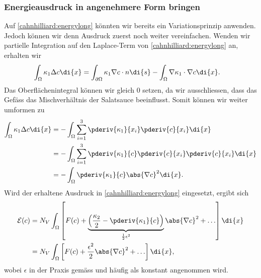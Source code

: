 \subsubsection{Energieausdruck in angenehmere Form bringen}
Auf \eqref{cahnhilliard:energylong} könnten wir bereits ein Variationsprinzip anwenden.
Jedoch können wir denn Ausdruck zuerst noch weiter vereinfachen.
Wenden wir partielle Integration auf den Laplace-Term von \eqref{cahnhilliard:energylong} an,
erhalten wir
\begin{align*}
\int_\Omega \kappa_1 \Delta c \di{x}
&=
\int_{\partial\Omega} \kappa_1 \nabla c \cdot n \di{s}
- \int_\Omega \nabla \kappa_1 \cdot \nabla c \di{x}
.
\end{align*}
Das Oberflächenintegral können wir gleich $0$ setzen,
da wir ausschliessen,
dass das Gefäss das Mischverhältnis der Salatsauce beeinflusst.
Somit können wir weiter umformen zu
\begin{align*}
\int_\Omega \kappa_1 \Delta c \di{x}
&=-\int_\Omega \sum_{i=1}^3 \pderiv{\kappa_1}{x_i} \pderiv{c}{x_i} \di{x}
\\
&=-\int_\Omega \sum_{i=1}^3 \pderiv{\kappa_1}{c} \pderiv{c}{x_i} \pderiv{c}{x_i} \di{x}
\\
&=
-\int_\Omega \pderiv{\kappa_1}{c} \abs{\nabla c}^2 \di{x}
.
\end{align*}
Wird der erhaltene Ausdruck in \eqref{cahnhilliard:energylong} eingesetzt,
ergibt sich
\begin{align}
\mathcal{E}(c)
&=
N_V \int_\Omega \left[
  F(c) + \underbrace{\left( \frac{\kappa_2}{2} - \pderiv{\kappa_1}{c} \right)}_{\frac{1}{2}\epsilon^2} \abs{\nabla c}^2  + \ldots
\right]\di{x}
\nonumber
\\
&=
N_V \int_\Omega \left[
  F(c) + \frac{\epsilon^2}{2} \abs{\nabla c}^2  + \ldots
\right]\di{x}
,
\label{cahnhilliard:energy}
\end{align}
wobei $\epsilon$ in der Praxis gemäss \cite{cahnhilliard:freeenergy}
und \cite{cahnhilliard:deriv} häufig als konstant angenommen wird.
